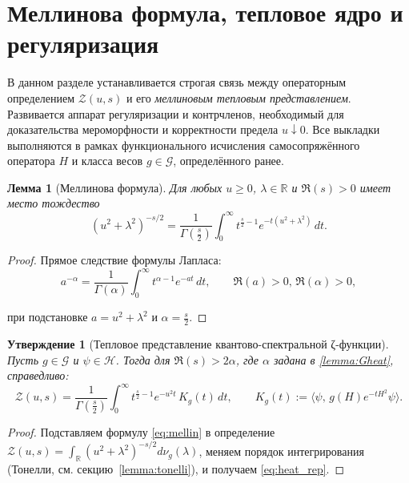 \documentclass{article}
\numberwithin{equation}{section}
\theoremstyle{plain}
\newtheorem{lemma}{Лемма}
\newtheorem{proposition}{Утверждение}
\theoremstyle{definition}
\theoremstyle{remark}
\def\alpha{α}\def\beta{β}\def\gamma{γ}\def\Gamma{Γ}%
\def\infty{∞}\def\partial{∂}\def\sum{Σ}\def\int{∫}%
\begin{document}
\clearpage

\section{Меллинова формула, тепловое ядро и регуляризация}

\noindent
В данном разделе устанавливается строгая связь между операторным определением
\(\mathcal Z(u,s)\) и его \emph{меллиновым тепловым представлением}.
Развивается аппарат регуляризации и контрчленов, необходимый для доказательства мероморфности
и корректности предела \(u\downarrow 0\).
Все выкладки выполняются в рамках функционального исчисления самосопряжённого оператора \(H\)
и класса весов \(g\in\mathcal G\), определённого ранее.


\begin{lemma}[Меллинова формула]
\label{lemma:mellin}
Для любых \(u\ge 0\), \(\lambda\in\mathbb R\) и \(\Re(s)>0\) имеет место тождество
\begin{equation}
\label{eq:mellin}
(u^2+\lambda^2)^{-s/2}
=\frac{1}{\Gamma\!\left(\frac s2\right)}
\int_0^\infty t^{\frac s2-1} e^{-t(u^2+\lambda^2)}\,dt.
\end{equation}
\end{lemma}

\begin{proof}
Прямое следствие формулы Лапласа:
\begin{equation}
a^{-\alpha} = \frac{1}{\Gamma(\alpha)} \int_0^\infty t^{\alpha-1} e^{-at}\,dt,
\qquad \Re(a)>0,\, \Re(\alpha)>0,
\label{eq:QSSC0045}
\end{equation}

при подстановке \(a=u^2+\lambda^2\) и \(\alpha=\tfrac{s}{2}\).
\end{proof}

\begin{proposition}[Тепловое представление квантово-спектральной ζ-функции]
\label{prop:heatZ}
Пусть \(g\in\mathcal G\) и \(\psi\in\mathcal H\). Тогда для \(\Re(s)>2\alpha\), где \(\alpha\) задана в \ref{lemma:Gheat}, справедливо:
\begin{equation}
\label{eq:heat_rep_app}
\mathcal Z(u,s)
=\frac{1}{\Gamma\!\left(\frac s2\right)}
\int_0^\infty t^{\frac s2-1} e^{-u^2 t}\,K_g(t)\,dt,
\qquad K_g(t):=\langle\psi,\,g(H)e^{-tH^2}\psi\rangle.
\end{equation}
\end{proposition}

\begin{proof}
Подставляем формулу \eqref{eq:mellin} в определение
\(
\mathcal Z(u,s)=\int_{\mathbb R}(u^2+\lambda^2)^{-s/2} d\nu_g(\lambda)
\),
меняем порядок интегрирования (Тонелли, см. секцию~\ref{lemma:tonelli}),
и получаем \eqref{eq:heat_rep}.
\end{proof}
\end{document}
